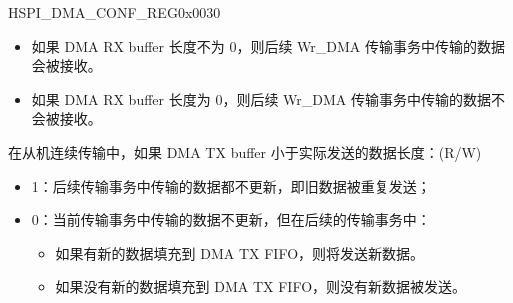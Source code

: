 \begin{register}{H}{SPI\_DMA\_CONF\_REG}{0x0030}
\begin{regdesc}
\begin{reglist}
\begin{itemize}
        \begin{itemize}
            \item 如果 DMA RX buffer 长度不为 0，则后续 Wr\_DMA 传输事务中传输的数据会被接收。
            \item 如果 DMA RX buffer 长度为 0，则后续 Wr\_DMA 传输事务中传输的数据不会被接收。
        \end{itemize}
\end{itemize}
\label{fielddesc:SPISLVTXSEGTRANSCLREN}\item [SPI\_SLV\_TX\_SEG\_TRANS\_CLR\_EN] 在从机连续传输中，如果 DMA TX buffer 小于实际发送的数据长度：(R/W)
\begin{itemize}
    \item 1：后续传输事务中传输的数据都不更新，即旧数据被重复发送；
    \item 0：当前传输事务中传输的数据不更新，但在后续的传输事务中：
            \begin{itemize}
            \item 如果有新的数据填充到 DMA TX FIFO，则将发送新数据。
            \item 如果没有新的数据填充到 DMA TX FIFO，则没有新数据被发送。
        \end{itemize}
\end{itemize}
\item [见下页]
\end{reglist}\end{regdesc}
\end{register}

